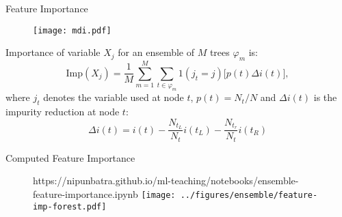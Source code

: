 \documentclass{beamer}
\begin{document}


\begin{frame}{Feature Importance\footnotemark}
  \begin{figure}
    \texttt{[image: mdi.pdf]}
  \end{figure}
  Importance of variable $X_j$ for an ensemble of $M$ trees $\varphi_{m}$ is:
  \begin{equation*}
    \text{Imp}(X_j) = \frac{1}{M} \sum_{m=1}^M \sum_{t \in \varphi_{m}} 1(j_t = j) \Big[ p(t) \Delta i(t) \Big],
  \end{equation*}
  where $j_t$ denotes the variable used at node $t$, $p(t)=N_t/N$ and $\Delta i(t)$ is the impurity reduction at node $t$:
  \begin{equation*}
    \Delta i(t) = i(t) - \frac{N_{t_L}}{N_t} i(t_L) - \frac{N_{t_r}}{N_t} i(t_R)
  \end{equation*}

\end{frame}


\begin{frame}{Computed Feature Importance}
  \begin{figure}[htp]
    \centering
    \begin{notebookbox}{https://nipunbatra.github.io/ml-teaching/notebooks/ensemble-feature-importance.ipynb}
      \texttt{[image: ../figures/ensemble/feature-imp-forest.pdf]}
    \end{notebookbox}
\end{figure}
\end{frame}
\end{document}

